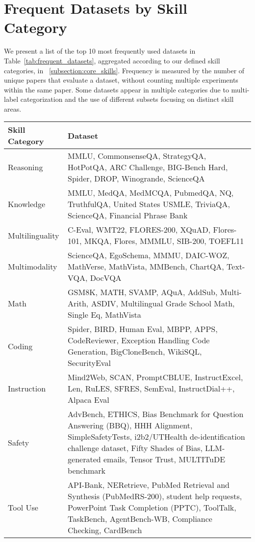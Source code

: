 \section{Frequent Datasets by Skill Category}
\label{appendix:frequent_datasets}

We present a list of the top 10 most frequently used datasets in Table~\ref{tab:frequent_datasets}, aggregated according to our defined skill categories, in ~\cref{subsection:core_skills}. 
Frequency is measured by the number of unique papers that evaluate a dataset, without counting multiple experiments within the same paper. 
Some datasets appear in multiple categories due to multi-label categorization and the use of different subsets focusing on distinct skill areas.

\begin{table*}[ht]  
    \centering  
    \small
    \renewcommand{\arraystretch}{1.3} 
    \begin{tabular}{p{}|p{}}
    \toprule
    \textbf{Skill Category} & \textbf{Dataset} \\ \midrule  
    Reasoning & MMLU, CommonsenseQA, StrategyQA, HotPotQA, ARC Challenge,
    BIG-Bench Hard, Spider, DROP, Winogrande, ScienceQA \\
    \hline
    Knowledge & MMLU, MedQA, MedMCQA, PubmedQA, NQ, TruthfulQA, United States USMLE, TriviaQA, ScienceQA, Financial Phrase Bank \\
    \hline 
    Multilinguality & C-Eval, WMT22, FLORES-200, XQuAD, Flores-101, MKQA, Flores, MMMLU, SIB-200, TOEFL11 \\
    \hline 
    Multimodality & ScienceQA, EgoSchema, MMMU, DAIC-WOZ, MathVerse, MathVista, MMBench, ChartQA, Text-VQA, DocVQA \\
    \hline 
    Math & GSM8K, MATH, SVAMP, AQuA, AddSub, Multi-Arith, ASDIV, Multilingual Grade School Math, Single Eq, MathVista \\
    \hline 
    Coding & Spider, BIRD, Human Eval, MBPP, APPS, CodeReviewer, Exception Handling Code Generation, BigCloneBench, WikiSQL, SecurityEval \\
    \hline 
    Instruction & Mind2Web, SCAN, PromptCBLUE, InstructExcel, Len, RuLES, SFRES, SemEval, InstructDial++, Alpaca Eval \\
    \hline 
    Safety & AdvBench, ETHICS, Bias Benchmark for Question Answering (BBQ), HHH Alignment, SimpleSafetyTests, i2b2/UTHealth de-identification challenge dataset, Fifty Shades of Bias, LLM-generated emails, Tensor Trust, MULTITuDE benchmark \\
    \hline 
    Tool Use & API-Bank, NERetrieve, PubMed Retrieval and Synthesis (PubMedRS-200), student help requests, PowerPoint Task Completion (PPTC), ToolTalk, TaskBench, AgentBench-WB, Compliance Checking, CardBench \\
    \bottomrule
    \end{tabular}
    \caption{Top 10 Most Frequent Datasets per Skill Category. Frequency is measured by the number of unique papers evaluating a dataset, without counting multiple experiments within the same paper.}  
    \label{tab:frequent_datasets}  
\end{table*}  